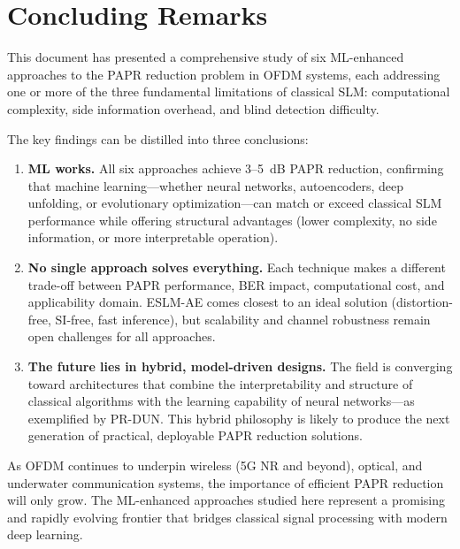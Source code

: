 \section{Concluding Remarks}
\label{sec:concluding_remarks}

This document has presented a comprehensive study of six ML-enhanced
approaches to the PAPR reduction problem in OFDM systems, each addressing
one or more of the three fundamental limitations of classical SLM:
computational complexity, side information overhead, and blind detection
difficulty.

The key findings can be distilled into three conclusions:

\begin{enumerate}
    \item \textbf{ML works.}
          All six approaches achieve 3--5~dB PAPR reduction, confirming that
          machine learning---whether neural networks, autoencoders, deep
          unfolding, or evolutionary optimization---can match or exceed
          classical SLM performance while offering structural advantages
          (lower complexity, no side information, or more interpretable
          operation).

    \item \textbf{No single approach solves everything.}
          Each technique makes a different trade-off between PAPR performance,
          BER impact, computational cost, and applicability domain.
          ESLM-AE comes closest to an ideal solution (distortion-free,
          SI-free, fast inference), but scalability and channel robustness
          remain open challenges for all approaches.

    \item \textbf{The future lies in hybrid, model-driven designs.}
          The field is converging toward architectures that combine
          the interpretability and structure of classical algorithms with
          the learning capability of neural networks---as exemplified by
          PR-DUN.  This hybrid philosophy is likely to produce the next
          generation of practical, deployable PAPR reduction solutions.
\end{enumerate}

As OFDM continues to underpin wireless (5G NR and beyond), optical, and
underwater communication systems, the importance of efficient PAPR reduction
will only grow.  The ML-enhanced approaches studied here represent a
promising and rapidly evolving frontier that bridges classical signal processing
with modern deep learning.
